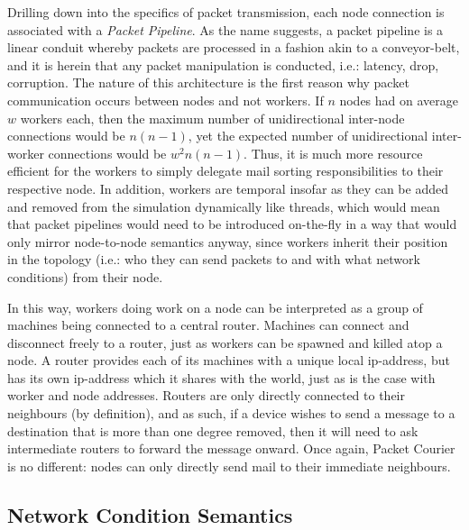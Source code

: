 Drilling down into the specifics of packet transmission, each node connection is associated with a \emph{Packet
Pipeline}. As the name suggests, a packet pipeline is a linear conduit whereby packets are processed in a fashion
akin to a conveyor-belt, and it is herein that any packet manipulation is conducted, i.e.: latency, drop, corruption.
The nature of this architecture is the first reason why packet communication occurs between nodes and not workers. If
$n$ nodes had on average $w$ workers each, then the maximum number of unidirectional inter-node connections would be
$n(n-1)$, yet the expected number of unidirectional inter-worker connections would be $w^2n(n-1)$. Thus, it is much
more resource efficient for the workers to simply delegate mail sorting responsibilities to their respective node. In
addition, workers are temporal insofar as they can be added and removed from the simulation dynamically like threads,
which would mean that packet pipelines would need to be introduced on-the-fly in a way that would only mirror
node-to-node semantics anyway, since workers inherit their position in the topology (i.e.: who they can send packets
to and with what network conditions) from their node.

In this way, workers doing work on a node can be interpreted as a group of machines being connected to a central
router. Machines can connect and disconnect freely to a router, just as workers can be spawned and killed atop a node. A
router provides each of its machines with a unique local ip-address, but has its own ip-address which it shares with
the world, just as is the case with worker and node addresses. Routers are only directly connected to their
neighbours (by definition), and as such, if a device wishes to send a message to a destination that is more than one
degree removed, then it will need to ask intermediate routers to forward the message onward. Once again, Packet
Courier is no different: nodes can only directly send mail to their immediate neighbours.

\subsection{Network Condition Semantics}

